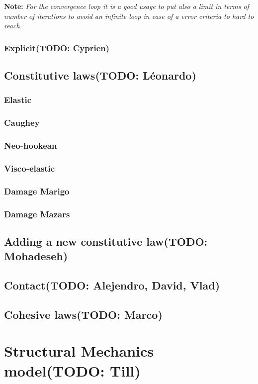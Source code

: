 \documentclass[a4paper,11pt]{book}
\newcommand{\note}[1]{\textbf{Note: }\textit{#1}}
\newcommand{\todo}[1]{({\small\color{red}\textbf{TODO: }\textbf{#1}})}
\begin{document}
\note{For the convergence loop  it is a good usage to put  also a limit in terms
  of number of iterations to avoid an  infinite loop in case of a error criteria
  to hard to reach.}

\subsubsection{Explicit\todo{Cyprien}}

\subsection{Constitutive laws\todo{L\'eonardo}}
\subsubsection{Elastic}
\subsubsection{Caughey}
\subsubsection{Neo-hookean}
\subsubsection{Visco-elastic}
\subsubsection{Damage Marigo}
\subsubsection{Damage Mazars}

\subsection{Adding a new constitutive law\todo{Mohadeseh}}

\subsection{Contact\todo{Alejendro, David, Vlad}}

\subsection{Cohesive laws\todo{Marco}}


\section{Structural Mechanics model\todo{Till}}
\end{document}
